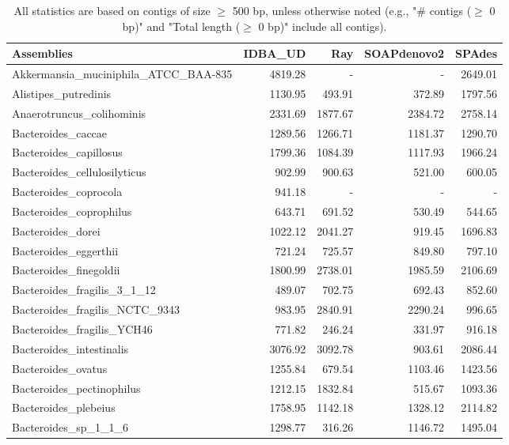 \documentclass[12pt,a4paper]{article}
\begin{document}
\begin{table}[ht]
\begin{center}
\caption{All statistics are based on contigs of size $\geq$ 500 bp, unless otherwise noted (e.g., "\# contigs ($\geq$ 0 bp)" and "Total length ($\geq$ 0 bp)" include all contigs).}
\begin{tabular}{|l*{4}{|r}|}
\hline
Assemblies & IDBA\_UD & Ray & SOAPdenovo2 & SPAdes \\ \hline
Akkermansia\_muciniphila\_ATCC\_BAA-835 & 4819.28 & - & - & 2649.01 \\ \hline
Alistipes\_putredinis & 1130.95 & 493.91 & 372.89 & 1797.56 \\ \hline
Anaerotruncus\_colihominis & 2331.69 & 1877.67 & 2384.72 & 2758.14 \\ \hline
Bacteroides\_caccae & 1289.56 & 1266.71 & 1181.37 & 1290.70 \\ \hline
Bacteroides\_capillosus & 1799.36 & 1084.39 & 1117.93 & 1966.24 \\ \hline
Bacteroides\_cellulosilyticus & 902.99 & 900.63 & 521.00 & 600.05 \\ \hline
Bacteroides\_coprocola & 941.18 & - & - & - \\ \hline
Bacteroides\_coprophilus & 643.71 & 691.52 & 530.49 & 544.65 \\ \hline
Bacteroides\_dorei & 1022.12 & 2041.27 & 919.45 & 1696.83 \\ \hline
Bacteroides\_eggerthii & 721.24 & 725.57 & 849.80 & 797.10 \\ \hline
Bacteroides\_finegoldii & 1800.99 & 2738.01 & 1985.59 & 2106.69 \\ \hline
Bacteroides\_fragilis\_3\_1\_12 & 489.07 & 702.75 & 692.43 & 852.60 \\ \hline
Bacteroides\_fragilis\_NCTC\_9343 & 983.95 & 2840.91 & 2290.24 & 996.65 \\ \hline
Bacteroides\_fragilis\_YCH46 & 771.82 & 246.24 & 331.97 & 916.18 \\ \hline
Bacteroides\_intestinalis & 3076.92 & 3092.78 & 903.61 & 2086.44 \\ \hline
Bacteroides\_ovatus & 1255.84 & 679.54 & 1103.46 & 1423.56 \\ \hline
Bacteroides\_pectinophilus & 1212.15 & 1832.84 & 515.67 & 1093.36 \\ \hline
Bacteroides\_plebeius & 1758.95 & 1142.18 & 1328.12 & 2114.82 \\ \hline
Bacteroides\_sp\_1\_1\_6 & 1298.77 & 316.26 & 1146.72 & 1495.04 \\ \hline

\end{tabular}
\end{center}
\end{table}
\end{document}
